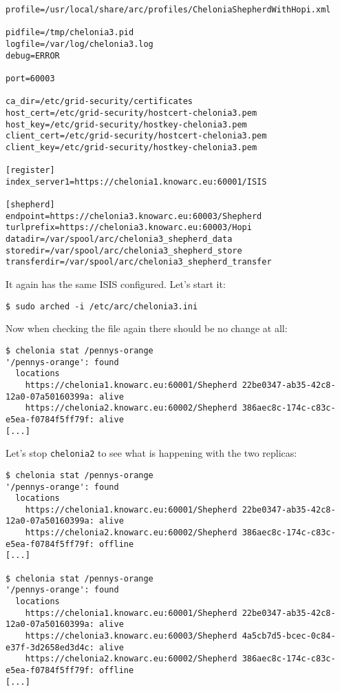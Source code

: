 \documentclass{article}
\begin{document}
\begin{verbatim}
profile=/usr/local/share/arc/profiles/CheloniaShepherdWithHopi.xml

pidfile=/tmp/chelonia3.pid
logfile=/var/log/chelonia3.log
debug=ERROR

port=60003

ca_dir=/etc/grid-security/certificates
host_cert=/etc/grid-security/hostcert-chelonia3.pem
host_key=/etc/grid-security/hostkey-chelonia3.pem
client_cert=/etc/grid-security/hostcert-chelonia3.pem
client_key=/etc/grid-security/hostkey-chelonia3.pem

[register]
index_server1=https://chelonia1.knowarc.eu:60001/ISIS

[shepherd]
endpoint=https://chelonia3.knowarc.eu:60003/Shepherd
turlprefix=https://chelonia3.knowarc.eu:60003/Hopi
datadir=/var/spool/arc/chelonia3_shepherd_data
storedir=/var/spool/arc/chelonia3_shepherd_store
transferdir=/var/spool/arc/chelonia3_shepherd_transfer
\end{verbatim}

It again has the same ISIS configured. Let's start it:

\begin{verbatim}
$ sudo arched -i /etc/arc/chelonia3.ini
\end{verbatim}

Now when checking the file again there should be no change at all:

\begin{verbatim}
$ chelonia stat /pennys-orange
'/pennys-orange': found
  locations
    https://chelonia1.knowarc.eu:60001/Shepherd 22be0347-ab35-42c8-12a0-07a50160399a: alive
    https://chelonia2.knowarc.eu:60002/Shepherd 386aec8c-174c-c83c-e5ea-f0784f5ff79f: alive
[...]
\end{verbatim}

Let's stop \verb!chelonia2! to see what is happening with the two replicas:

\begin{verbatim}
$ chelonia stat /pennys-orange
'/pennys-orange': found
  locations
    https://chelonia1.knowarc.eu:60001/Shepherd 22be0347-ab35-42c8-12a0-07a50160399a: alive
    https://chelonia2.knowarc.eu:60002/Shepherd 386aec8c-174c-c83c-e5ea-f0784f5ff79f: offline
[...]

$ chelonia stat /pennys-orange
'/pennys-orange': found
  locations
    https://chelonia1.knowarc.eu:60001/Shepherd 22be0347-ab35-42c8-12a0-07a50160399a: alive
    https://chelonia3.knowarc.eu:60003/Shepherd 4a5cb7d5-bcec-0c84-e37f-3d2658ed3d4c: alive
    https://chelonia2.knowarc.eu:60002/Shepherd 386aec8c-174c-c83c-e5ea-f0784f5ff79f: offline
[...]

\end{verbatim}
\end{document}
